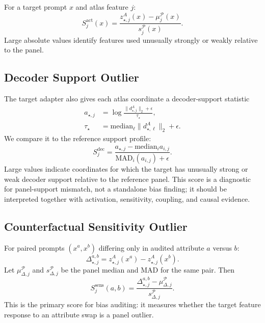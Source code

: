 \documentclass[11pt]{article}
\newcommand{\panel}{\mathcal{P}}
\newcommand{\mad}{\mathrm{MAD}}
\begin{document}
For a target prompt $x$ and atlas feature $j$:
\begin{equation}
    S^{\mathrm{act}}_{j}(x)=
    \frac{z_{\star,j}^A(x)-\mu_j^{\panel}(x)}{s_j^{\panel}(x)}.
\end{equation}
Large absolute values identify features used unusually strongly or weakly relative to the panel.

\subsection{Decoder Support Outlier}

The target adapter also gives each atlas coordinate a decoder-support statistic
\begin{equation}
    \begin{aligned}
    a_{\star,j}
    &=\log\frac{\|d_{\star,j}^A\|_2+\epsilon}{\tau_\star},\\
    \tau_\star
    &=\mathrm{median}_{\ell}\|d_{\star,\ell}^A\|_2+\epsilon.
    \end{aligned}
\end{equation}
We compare it to the reference support profile:
\begin{equation}
    S^{\mathrm{dec}}_j=
    \frac{a_{\star,j}-\mathrm{median}_i a_{i,j}}{\mad_i(a_{i,j})+\epsilon}.
\end{equation}
Large values indicate coordinates for which the target has unusually strong or weak decoder support relative to the reference panel. This score is a diagnostic for panel-support mismatch, not a standalone bias finding; it should be interpreted together with activation, sensitivity, coupling, and causal evidence.

\subsection{Counterfactual Sensitivity Outlier}

For paired prompts $(x^a,x^b)$ differing only in audited attribute $a$ versus $b$:
\begin{equation}
    \Delta_{\star,j}^{a,b}=z_{\star,j}^A(x^a)-z_{\star,j}^A(x^b).
\end{equation}
Let $\mu_{\Delta,j}^{\panel}$ and $s_{\Delta,j}^{\panel}$ be the panel median and MAD for the same pair. Then
\begin{equation}
    S^{\mathrm{sens}}_{j}(a,b)=
    \frac{\Delta_{\star,j}^{a,b}-\mu_{\Delta,j}^{\panel}}{s_{\Delta,j}^{\panel}}.
\end{equation}
This is the primary score for bias auditing: it measures whether the target feature response to an attribute swap is a panel outlier.
\end{document}

